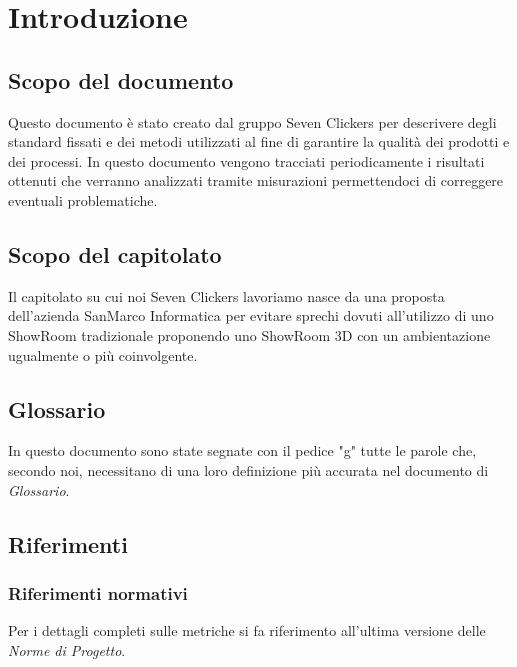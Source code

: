 \section{Introduzione}
\subsection{Scopo del documento}
Questo documento è stato creato dal gruppo Seven Clickers per descrivere degli standard fissati e dei metodi utilizzati al fine di garantire la qualità dei prodotti e dei processi.
In questo documento vengono tracciati periodicamente i risultati ottenuti che verranno analizzati tramite misurazioni permettendoci di correggere eventuali problematiche.

\subsection{Scopo del capitolato}
Il capitolato su cui noi Seven Clickers lavoriamo nasce da una proposta dell'azienda SanMarco Informatica per evitare sprechi dovuti all'utilizzo di uno ShowRoom tradizionale proponendo uno ShowRoom 3D con un ambientazione ugualmente o più coinvolgente.

\subsection{Glossario}
In questo documento sono state segnate con il pedice "g" tutte le parole che, secondo noi, necessitano di una loro definizione più accurata nel documento di \textit{Glossario}.

\subsection{Riferimenti}
\subsubsection{Riferimenti normativi}
Per i dettagli completi sulle metriche si fa riferimento all'ultima versione delle \textit{Norme di Progetto}.

